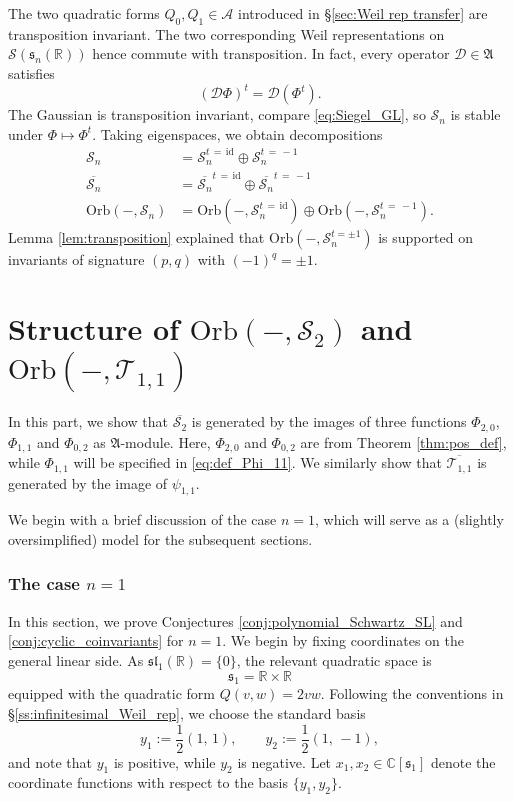 \documentclass[reqno, 11pt]{amsart} %
\numberwithin{equation}{section}
\theoremstyle{plain}
\theoremstyle{definition}
\theoremstyle{remark}
\newcommand{\ov}{\overline}
\newcommand{\mr}{\mathrm}
\newcommand{\mbR}{\mathbb{R}}
\newcommand{\mcA}{\mathcal{A}}
\newcommand{\mcD}{\mathcal{D}}
\newcommand{\mcS}{\mathcal{S}}
\newcommand{\mcT}{\mathcal{T}}
\newcommand{\mfA}{\mathfrak{A}}
\newcommand{\mfs}{\mathfrak{s}}
\newcommand{\bbC}{\mathbb C}
\newcommand{\lie}[1]{ \mathfrak{#1}}
\newcommand{\Orb}{\mathrm{Orb}}
\begin{document}
The two quadratic forms $Q_0, Q_1\in \mcA$ introduced in \S\ref{sec:Weil rep transfer} are transposition invariant. The two corresponding Weil representations on $\mcS(\mfs_n(\mbR))$ hence commute with transposition. In fact, every operator $\mcD\in \mfA$ satisfies
$$(\mcD Φ)^t = \mcD (Φ^t).$$
The Gaussian is transposition invariant, compare \eqref{eq:Siegel_GL}, so $\mcS_n$ is stable under $Φ\mapsto Φ^t$. Taking eigenspaces, we obtain decompositions
\begin{equation}
\begin{aligned}
\mcS_n & = \mcS_n^{t\,=\, \mr{id}} \oplus \mcS_n^{t \,=\, -1}\\
\ov {\mcS_n} & = \ov{\mcS_n}^{t \,=\, \mr{id}} \oplus \ov{\mcS_n}^{t \,=\, -1}\\
\Orb(-,\mcS_n) & = \Orb(-,\mcS_n^{t\,=\,\mr{id}}) \oplus \Orb(-,\mcS_n^{t \,=\, -1}).
\end{aligned}
\end{equation}
Lemma \ref{lem:transposition} explained that $\Orb(-,\mcS_n^{t = \pm 1})$ is supported on invariants of signature $(p,q)$ with $(-1)^q = \pm 1$.

\newpage

\part{Structure of $\Orb(-,\mcS_2)$ and $\Orb(-,\mcT_{1,1})$}

In this part, we show that $\ov{\mcS_2}$ is generated by the images of three functions $Φ_{2,0}$, $Φ_{1,1}$ and $Φ_{0,2}$ as $\mfA$-module. Here, $Φ_{2,0}$ and $Φ_{0,2}$ are from Theorem \ref{thm:pos_def}, while $Φ_{1,1}$ will be specified in \eqref{eq:def_Phi_11}. We similarly show that $\ov{\mcT_{1,1}}$ is generated by the image of $ψ_{1,1}$.

We begin with a brief discussion of the case $n = 1$, which will serve as a (slightly oversimplified) model for the subsequent sections.

\section{The case $n = 1$}\label{s:n_equal_1}
In this section, we prove Conjectures \ref{conj:polynomial_Schwartz_SL} and \ref{conj:cyclic_coinvariants} for $n=1$. We begin by fixing coordinates on the general linear side. As $\lie{sl}_1(\mathbb R) = \{0\}$, the relevant quadratic space is
\[
\lie s_1 = \mathbb R \times \mathbb R
\]
equipped with the quadratic form $Q(v,w) = 2vw$. Following the conventions in \S\ref{ss:infinitesimal_Weil_rep}, we choose the standard basis
\[
y_1 := \frac1{ 2 } (1,\,1), \qquad y_2 := \frac{1}{ 2} (1,\,-1),
\]
and note that $y_1$ is positive, while $y_2$ is negative. Let $x_1, x_2 \in \bbC[\lie s_1]$ denote the coordinate functions with respect to the basis $\{ y_1, y_2\}$.
\end{document}
